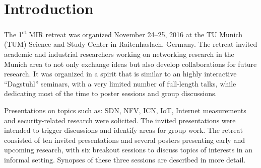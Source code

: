 \section{Introduction}\label{sec:introduction}


The 1\textsuperscript{st} \ac{MIR} retreat was organized November 24--25, 2016 at
the TU Munich (TUM) Science and Study Center in Raitenhaslach, Germany.  The retreat
invited academic and industrial researchers working on networking research in
the Munich area to not only exchange ideas but also develop collaborations
for future research.  It was organized in a spirit that is similar to an
highly interactive ``Dagstuhl'' seminars, with a very limited number of
full-length talks, while dedicating most of the time to poster sessions and
group discussions.

Presentations on topics such as: \ac{SDN}, \ac{NFV}, \ac{ICN}, \ac{IoT},
Internet measurements and security-related research were solicited. The
invited presentations were intended to trigger discussions and identify areas
for group work. The retreat consisted of ten invited presentations and several
posters presenting early and upcoming research, with six breakout sessions to
discuss topics of interests in an informal setting. Synopses of these three
sessions are described in more detail.
